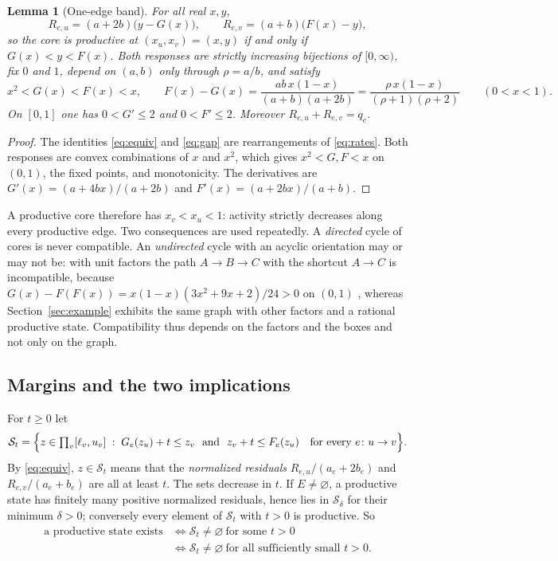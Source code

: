 \documentclass[11pt,a4paper]{article}
\theoremstyle{plain}
\newtheorem{lemma}[theorem]{Lemma}
\theoremstyle{definition}
\theoremstyle{remark}
\newcommand{\St}{\mathcal{S}_t}
\newcommand{\Sset}[1]{\mathcal{S}_{#1}}
\begin{document}
\begin{lemma}[One-edge band]\label{lem:edge}
For all real $x,y$,
\begin{equation}\label{eq:equiv}
  R_{e,u}=(a+2b)\bigl(y-G(x)\bigr),\qquad R_{e,v}=(a+b)\bigl(F(x)-y\bigr),
\end{equation}
so the core is productive at $(x_u,x_v)=(x,y)$ if and only if $G(x)<y<F(x)$. Both responses are strictly increasing bijections of $[0,\infty)$, fix $0$ and $1$, depend on $(a,b)$ only through $\rho=a/b$, and satisfy
\begin{equation}\label{eq:gap}
  x^2<G(x)<F(x)<x,\qquad F(x)-G(x)=\frac{ab\,x(1-x)}{(a+b)(a+2b)}=\frac{\rho\,x(1-x)}{(\rho+1)(\rho+2)}\qquad(0<x<1).
\end{equation}
On $[0,1]$ one has $0<G'\le2$ and $0<F'\le2$. Moreover $R_{e,u}+R_{e,v}=q_e$.
\end{lemma}
\begin{proof}
The identities \eqref{eq:equiv} and \eqref{eq:gap} are rearrangements of \eqref{eq:rates}. Both responses are convex combinations of $x$ and $x^2$, which gives $x^2<G,F<x$ on $(0,1)$, the fixed points, and monotonicity. The derivatives are $G'(x)=(a+4bx)/(a+2b)$ and $F'(x)=(a+2bx)/(a+b)$.
\end{proof}

A productive core therefore has $x_v<x_u<1$: activity strictly decreases along every productive edge. Two consequences are used repeatedly. A \emph{directed} cycle of cores is never compatible. An \emph{undirected} cycle with an acyclic orientation may or may not be: with unit factors the path $A\to B\to C$ with the shortcut $A\to C$ is incompatible, because $G(x)-F(F(x))=x(1-x)(3x^2+9x+2)/24>0$ on $(0,1)$ \citep{tcch2026,jp2026}, whereas Section~\ref{sec:example} exhibits the same graph with other factors and a rational productive state. Compatibility thus depends on the factors and the boxes and not only on the graph.

\subsection{Margins and the two implications}
For $t\ge0$ let
\begin{equation}\label{eq:margin}
 \St=\Bigl\{z\in\textstyle\prod_v[\ell_v,u_v]\;:\; G_e(z_u)+t\le z_v\ \text{ and }\ z_v+t\le F_e(z_u)\quad\text{for every } e\colon u\to v\Bigr\}.
\end{equation}
By \eqref{eq:equiv}, $z\in\St$ means that the \emph{normalized residuals} $R_{e,u}/(a_e+2b_e)$ and $R_{e,v}/(a_e+b_e)$ are all at least $t$. The sets decrease in $t$. If $E\neq\varnothing$, a productive state has finitely many positive normalized residuals, hence lies in $\Sset{\delta}$ for their minimum $\delta>0$; conversely every element of $\St$ with $t>0$ is productive. So
\begin{equation}\label{eq:strictiff}
\begin{aligned}
  \text{a productive state exists}&\iff \St\neq\varnothing\ \text{for some } t>0\\
  &\iff \St\neq\varnothing\ \text{for all sufficiently small } t>0 .
\end{aligned}
\end{equation}
\end{document}
